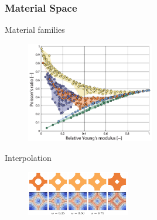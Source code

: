 \documentclass[serif,mathserif]{beamer}
\begin{document}
\begin{frame}
  \frametitle{Material Space}
  \begin{itemize}
  \item Material families
    \begin{figure}
      \includegraphics[width=0.5\textwidth]{img/mtrfamily}
    \end{figure}
     {
    \item Interpolation
      \begin{figure}
        \includegraphics[width=0.4\textwidth]{img/mtrinterp}
      \end{figure}
    }
  \end{itemize}
\end{frame}
\end{document}
